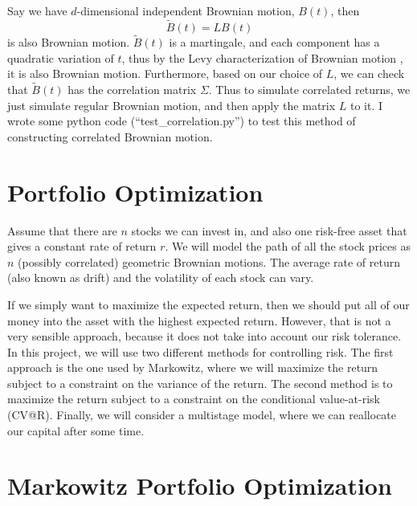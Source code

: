 \documentclass{amsart}
\theoremstyle{definition}
\theoremstyle{remark}
\begin{document}
Say we have $d$-dimensional independent Brownian motion, $B(t)$, then
\begin{equation*}
\tilde{B}(t) = LB(t)
\end{equation*}
is also Brownian motion. $\tilde{B}(t)$ is a martingale, and each component has a quadratic variation of $t$, thus by the Levy characterization of Brownian motion , it is also Brownian motion\cite{timo}. Furthermore, based on our choice of $L$, we can check that  $\tilde{B}(t)$ has the correlation matrix $\Sigma$. Thus to simulate correlated returns, we just simulate regular Brownian motion, and then apply the matrix $L$ to it. I wrote some python code (``test\_correlation.py'') to test this method of constructing correlated Brownian motion.
\section{Portfolio Optimization}
Assume that there are $n$ stocks we can invest in, and also one risk-free asset that gives a constant rate of return $r$. We will model the path of all the stock prices as $n$ (possibly correlated) geometric Brownian motions. The average rate of return (also known as drift) and the volatility of each stock can vary.

If we simply want to maximize the expected return, then we should put all of our money into the asset with the highest expected return. However, that is not a very sensible approach, because it does not take into account our risk tolerance. In this project, we will use two different methods for controlling risk. The first approach is the one used by Markowitz, where we will maximize the return subject to a constraint on the variance of the return. The second method is to maximize the return subject to a constraint on the conditional value-at-risk (CV@R). Finally, we will consider a multistage model, where we can reallocate our capital after some time.

\section{Markowitz Portfolio Optimization}
\end{document}
